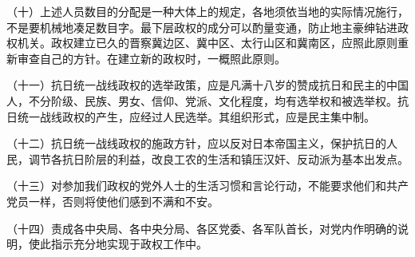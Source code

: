 （十）上述人员数目的分配是一种大体上的规定，各地须依当地的实际情况施行，不是要机械地凑足数目字。最下层政权的成分可以酌量变通，防止地主豪绅钻进政权机关。政权建立已久的晋察冀边区、冀中区、太行山区和冀南区，应照此原则重新审查自己的方针。在建立新的政权时，一概照此原则。

（十一）抗日统一战线政权的选举政策，应是凡满十八岁的赞成抗日和民主的中国人，不分阶级、民族、男女、信仰、党派、文化程度，均有选举权和被选举权。抗日统一战线政权的产生，应经过人民选举。其组织形式，应是民主集中制。

（十二）抗日统一战线政权的施政方针，应以反对日本帝国主义，保护抗日的人民，调节各抗日阶层的利益，改良工农的生活和镇压汉奸、反动派为基本出发点。

（十三）对参加我们政权的党外人士的生活习惯和言论行动，不能要求他们和共产党员一样，否则将使他们感到不满和不安。

（十四）责成各中央局、各中央分局、各区党委、各军队首长，对党内作明确的说明，使此指示充分地实现于政权工作中。
